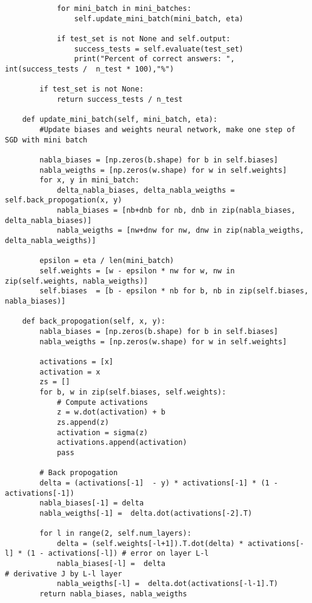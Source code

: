 \begin{lstlisting}
            for mini_batch in mini_batches:
                self.update_mini_batch(mini_batch, eta)

            if test_set is not None and self.output:
                success_tests = self.evaluate(test_set)
                print("Percent of correct answers: ", int(success_tests /  n_test * 100),"%")

        if test_set is not None:
            return success_tests / n_test

    def update_mini_batch(self, mini_batch, eta):
        #Update biases and weights neural network, make one step of SGD with mini batch
        
        nabla_biases = [np.zeros(b.shape) for b in self.biases]
        nabla_weigths = [np.zeros(w.shape) for w in self.weights]
        for x, y in mini_batch:
            delta_nabla_biases, delta_nabla_weigths = self.back_propogation(x, y)
            nabla_biases = [nb+dnb for nb, dnb in zip(nabla_biases, delta_nabla_biases)]
            nabla_weigths = [nw+dnw for nw, dnw in zip(nabla_weigths, delta_nabla_weigths)]
            
        epsilon = eta / len(mini_batch)
        self.weights = [w - epsilon * nw for w, nw in zip(self.weights, nabla_weigths)]
        self.biases  = [b - epsilon * nb for b, nb in zip(self.biases,  nabla_biases)]
            
    def back_propogation(self, x, y):
        nabla_biases = [np.zeros(b.shape) for b in self.biases]
        nabla_weigths = [np.zeros(w.shape) for w in self.weights]

        activations = [x]
        activation = x
        zs = []
        for b, w in zip(self.biases, self.weights):
            # Compute activations
            z = w.dot(activation) + b
            zs.append(z)
            activation = sigma(z)
            activations.append(activation)
            pass

        # Back propogation
        delta = (activations[-1]  - y) * activations[-1] * (1 - activations[-1]) 
        nabla_biases[-1] = delta 
        nabla_weigths[-1] =  delta.dot(activations[-2].T)

        for l in range(2, self.num_layers):
            delta = (self.weights[-l+1]).T.dot(delta) * activations[-l] * (1 - activations[-l]) # error on layer L-l
            nabla_biases[-l] =  delta                                                           # derivative J by L-l layer
            nabla_weigths[-l] =  delta.dot(activations[-l-1].T)
        return nabla_biases, nabla_weigths
    

\end{lstlisting}
